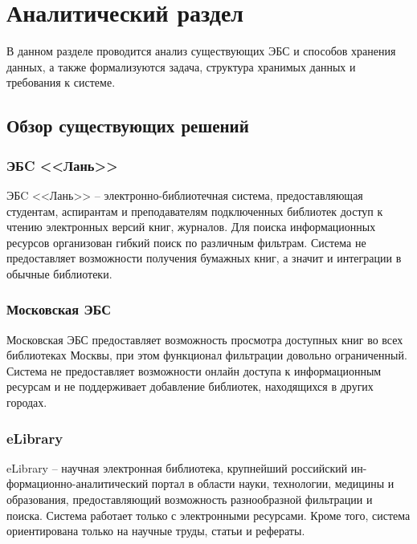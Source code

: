 \chapter{Аналитический раздел}

В данном разделе проводится анализ существующих ЭБС и способов хранения данных, а также формализуются задача, структура хранимых данных и требования к системе.
\section{Обзор существующих решений}

\subsection{ЭБC <<Лань>>}
ЭБC <<Лань>> – электронно-библиотечная система, предоставляющая студентам, аспирантам и преподавателям подключенных библиотек доступ к чтению электронных версий книг, журналов. Для поиска информационных ресурсов организован гибкий поиск по различным фильтрам. Система не предоставляет возможности получения бумажных книг, а значит и интеграции в обычные библиотеки. 

\subsection{Московская ЭБС}
Московская ЭБС предоставляет возможность просмотра доступных книг во всех библиотеках Москвы, при этом функционал фильтрации довольно ограниченный. Система не предоставляет возможности онлайн доступа к информационным ресурсам и не поддерживает добавление библиотек, находящихся в других городах. 

\subsection{eLibrary}
eLibrary -- научная электронная библиотека, крупнейший российский ин- формационно-аналитический портал в области науки, технологии, медицины и образования, предоставляющий возможность разнообразной фильтрации и поиска. Система работает только с электронными ресурсами. Кроме того, система ориентирована только на научные труды, статьи и рефераты.

